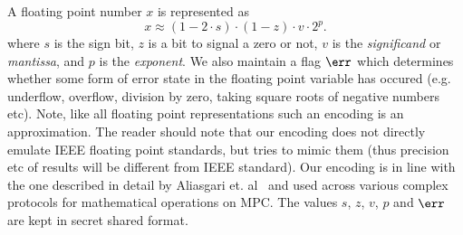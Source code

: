 \noindent
A floating point number $x$ is represented as 
\[
			x\approx (1-2 \cdot s)\cdot (1-z)\cdot v\cdot 2^{p}.
\]
where $s$ is the sign bit,
$z$ is a bit to signal a zero or not,
$v$ is the \textit{significand} or \textit{mantissa},
and $p$ is the \textit{exponent}.
We also maintain a flag $\err$ which determines whether
some form of error state in the floating point variable
has occured (e.g. underflow, overflow, division by zero, taking
square roots of negative numbers etc).
Note, like all floating point representations such an encoding is 
an approximation.
The reader should note that our encoding does not directly
emulate IEEE floating point standards, but tries to mimic them
(thus precision etc of results will be different from IEEE
standard).
Our encoding is in line with the one described in detail 
by Aliasgari et. al~\cite{ABZS13} and used across various 
complex protocols for mathematical operations on MPC.
The values $s$, $z$, $v$, $p$ and $\err$ are kept in
secret shared format.

